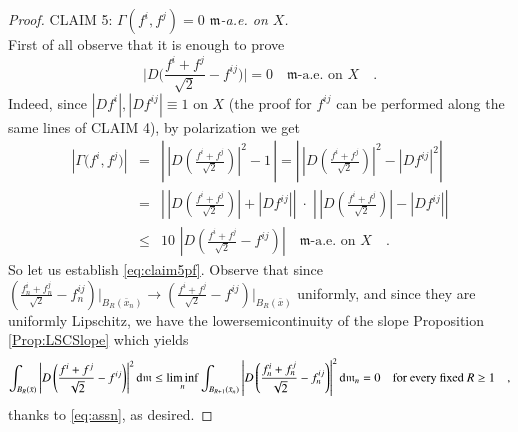 \documentclass[11pt,reqno]{amsart}
\newcommand{\mm}{\mathfrak m}
\renewcommand{\d}{{\rm{d}}}
\theoremstyle{definition}
\theoremstyle{remark}
\theoremstyle{remark}
\theoremstyle{remark}
\theoremstyle{remark}
\theoremstyle{remark}
\theoremstyle{remark}
\theoremstyle{remark}
\begin{document}
\begin{proof}
CLAIM 5: \emph{$\Gamma(f^i,f^j)=0$ $\mm$-a.e. on $X$.}
\\First of all observe that it is enough to prove 
\begin{equation}\label{eq:claim5pf}
\Big|D\Big( \frac{f^i+f^j}{\sqrt{2}}-f^{ij}\Big) \Big|=0 \quad \mm\text{-a.e. on } X \quad.
\end{equation} 
Indeed, since $|Df^i|, |Df^{ij}|\equiv 1$ on $X$ (the proof for $f^{ij}$ can be performed along the same lines of  CLAIM 4), by polarization we get
\begin{eqnarray}
\left|\Gamma\Big(f^i,f^j \Big) \right| &=& \left|\,  \left|D \left( \frac{f^i+f^j }{\sqrt 2}\right)\right|^2 -1\,  \right|= \left| \, \left|D \left( \frac{f^i+f^j }{\sqrt 2}\right)\right|^2-  \left| D f^{ij}\right|^2 \right| \nonumber \\
&=&\left| \, \left|D  \left( \frac{f^i+f^j }{\sqrt 2}\right) \right|+  \left| D f^{ij}\right| \right| \; \cdot \; \left|\,   \left|D  \left( \frac{f^i+f^j }{\sqrt 2}\right) \right|-  \left| D f^{ij}\right| \right| \nonumber \\
&\leq&   10  \,  \, \left|D \left( \frac{f^i+f^j }{\sqrt 2}- f^{ij}\right) \right| \quad \mm\text{-a.e. on } X \quad . \nonumber
\end{eqnarray}
So let us establish \eqref{eq:claim5pf}. Observe that since $\left( \frac{f^i_n+f^j_n}{\sqrt{2}}-f^{ij}_n \right) \Big|_{B_R(\bar{x}_n)} \to  \left( \frac{f^i+f^j}{\sqrt{2}}-f^{ij}\right) \Big|_{B_R(\bar{x})}$ uniformly, and since they are  uniformly Lipschitz,  we have the lowersemicontinuity of the slope Proposition \ref{Prop:LSCSlope} which yields
$$
\int_{B_R(\bar{x})} \left|D\left( \frac{f^i+f^j}{\sqrt{2}}-f^{ij}\right) \right|^2 \d\mm \leq  \liminf_n  \int_{B_{R+1}(\bar{x}_n)} \left|D\left( \frac{f^i_n+f^j_n}{\sqrt{2}}-f^{ij}_n\right) \right|^2 \d\mm_n =0 \quad \text{for every fixed } R\geq 1 \quad, $$
thanks to  \eqref{eq:assn}, as desired.

\end{proof}
\end{document}
